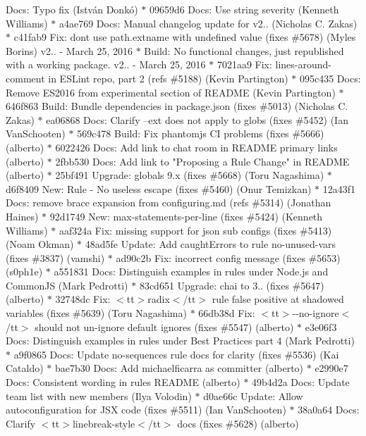 \begin{DoxyItemize}
Docs\+: Typo fix (\+István Donkó) \texorpdfstring{$\ast$}{*} 09659d6 Docs\+: Use string severity (\+Kenneth Williams) \texorpdfstring{$\ast$}{*} a4ae769 Docs\+: Manual changelog update for v2.. (\+Nicholas C. Zakas) \texorpdfstring{$\ast$}{*} c41fab9 Fix\+: don\textquotesingle{}t use path.\+extname with undefined value (fixes \#5678) (\+Myles Borins)  v2.. -\/ March 25, 2016  \texorpdfstring{$\ast$}{*} Build\+: No functional changes, just republished with a working package.  v2.. -\/ March 25, 2016  \texorpdfstring{$\ast$}{*} 7021aa9 Fix\+: lines-\/around-\/comment in ESLint repo, part 2 (refs \#5188) (\+Kevin Partington) \texorpdfstring{$\ast$}{*} 095c435 Docs\+: Remove ES2016 from experimental section of README (\+Kevin Partington) \texorpdfstring{$\ast$}{*} 646f863 Build\+: Bundle dependencies in package.\+json (fixes \#5013) (\+Nicholas C. Zakas) \texorpdfstring{$\ast$}{*} ea06868 Docs\+: Clarify --ext does not apply to globs (fixes \#5452) (\+Ian Van\+Schooten) \texorpdfstring{$\ast$}{*} 569c478 Build\+: Fix phantomjs CI problems (fixes \#5666) (alberto) \texorpdfstring{$\ast$}{*} 6022426 Docs\+: Add link to chat room in README primary links (alberto) \texorpdfstring{$\ast$}{*} 2fbb530 Docs\+: Add link to "{}Proposing a Rule Change"{} in README (alberto) \texorpdfstring{$\ast$}{*} 25bf491 Upgrade\+: globals 9.\+x (fixes \#5668) (\+Toru Nagashima) \texorpdfstring{$\ast$}{*} d6f8409 New\+: Rule -\/ No useless escape (fixes \#5460) (\+Onur Temizkan) \texorpdfstring{$\ast$}{*} 12a43f1 Docs\+: remove brace expansion from configuring.\+md (refs \#5314) (\+Jonathan Haines) \texorpdfstring{$\ast$}{*} 92d1749 New\+: max-\/statements-\/per-\/line (fixes \#5424) (\+Kenneth Williams) \texorpdfstring{$\ast$}{*} aaf324a Fix\+: missing support for json sub configs (fixes \#5413) (\+Noam Okman) \texorpdfstring{$\ast$}{*} 48ad5fe Update\+: Add \textquotesingle{}caught\+Errors\textquotesingle{} to rule no-\/unused-\/vars (fixes \#3837) (vamshi) \texorpdfstring{$\ast$}{*} ad90c2b Fix\+: incorrect config message (fixes \#5653) (s0ph1e) \texorpdfstring{$\ast$}{*} a551831 Docs\+: Distinguish examples in rules under Node.\+js and Common\+JS (\+Mark Pedrotti) \texorpdfstring{$\ast$}{*} 83cd651 Upgrade\+: chai to 3.. (fixes \#5647) (alberto) \texorpdfstring{$\ast$}{*} 32748dc Fix\+: $<$tt$>$radix$<$/tt$>$ rule false positive at shadowed variables (fixes \#5639) (\+Toru Nagashima) \texorpdfstring{$\ast$}{*} 66db38d Fix\+: $<$tt$>$-\/-\/no-\/ignore$<$/tt$>$ should not un-\/ignore default ignores (fixes \#5547) (alberto) \texorpdfstring{$\ast$}{*} e3e06f3 Docs\+: Distinguish examples in rules under Best Practices part 4 (\+Mark Pedrotti) \texorpdfstring{$\ast$}{*} a9f0865 Docs\+: Update no-\/sequences rule docs for clarity (fixes \#5536) (\+Kai Cataldo) \texorpdfstring{$\ast$}{*} bae7b30 Docs\+: Add michaelficarra as committer (alberto) \texorpdfstring{$\ast$}{*} e2990e7 Docs\+: Consistent wording in rules README (alberto) \texorpdfstring{$\ast$}{*} 49b4d2a Docs\+: Update team list with new members (\+Ilya Volodin) \texorpdfstring{$\ast$}{*} d0ae66c Update\+: Allow autoconfiguration for JSX code (fixes \#5511) (\+Ian Van\+Schooten) \texorpdfstring{$\ast$}{*} 38a0a64 Docs\+: Clarify $<$tt$>$linebreak-\/style$<$/tt$>$ docs (fixes \#5628) (alberto) 
\end{DoxyItemize}
